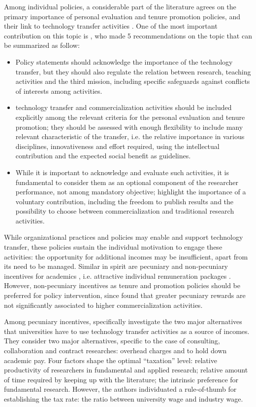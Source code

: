 Among individual policies, a considerable part of the literature agrees on the primary importance of personal evaluation and tenure promotion policies, and their link to technology transfer activities \citep{Debackere2005}. One of the most important contribution on this topic is \citet{Genshaft2016}, who made 5 recommendations on the topic that can be summarized as follow:
\begin{itemize}
\item Policy statements should acknowledge the importance of the technology transfer, but they should also regulate the relation between research, teaching activities and the third mission, including specific safeguards against conflicts of interests among activities.
\item technology transfer and commercialization activities should be included explicitly among the relevant criteria for the personal evaluation and tenure promotion; they should be assessed with enough flexibility to include many relevant characteristic of the transfer, i.e. the relative importance in various disciplines, innovativeness and effort required, using the intellectual contribution and the expected social benefit as guidelines. 
\item While it is important to acknowledge and evaluate such activities, it is fundamental to consider them as an optional component of the researcher performance, not among mandatory objective; \citet{Rasmussen2006} highlight the importance of a voluntary contribution, including the freedom to publish results and the possibility to choose between commercialization and traditional research activities. 
\end{itemize}

While organizational practices and policies may enable and support technology transfer, these policies sustain the individual motivation to engage these activities: the opportunity for additional incomes may be insufficient, apart from its need to be managed. Similar in spirit are pecuniary and non-pecuniary incentives for academics \citep{Link2007}, i.e. attractive individual remuneration packages \citep{Debackere2005}. However, non-pecuniary incentives as tenure and promotion policies should be preferred for policy intervention, since \citet{Friedman2003} found that greater pecuniary rewards are not significantly associated to higher commercialization activities.

Among pecuniary incentives, \citet{Beath2000} specifically investigate the two major alternatives that universities have to use technology transfer activities as a source of incomes. They consider two major alternatives, specific to the case of consulting, collaboration and contract researches: overhead charges and to hold down academic pay. Four factors shape the optimal \enquote{taxation} level: relative productivity of researchers in fundamental and applied research; relative amount of time required by keeping up with the literature; the intrinsic preference for fundamental research. However, the authors individuated a rule-of-thumb for establishing the tax rate: the ratio between university wage and industry wage.

